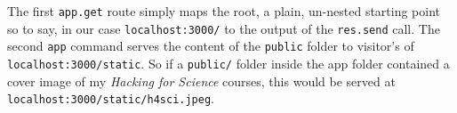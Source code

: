 \documentclass[
  12pt,
  letterpaper,
]{krantz}
\newenvironment{Shaded}{\begin{snugshade}}{\end{snugshade}}
\newcommand{\BuiltInTok}[1]{\textcolor[rgb]{0.00,0.23,0.31}{#1}}
\newcommand{\DecValTok}[1]{\textcolor[rgb]{0.68,0.00,0.00}{#1}}
\newcommand{\FunctionTok}[1]{\textcolor[rgb]{0.28,0.35,0.67}{#1}}
\newcommand{\KeywordTok}[1]{\textcolor[rgb]{0.00,0.23,0.31}{#1}}
\newcommand{\NormalTok}[1]{\textcolor[rgb]{0.00,0.23,0.31}{#1}}
\newcommand{\OperatorTok}[1]{\textcolor[rgb]{0.37,0.37,0.37}{#1}}
\newcommand{\PreprocessorTok}[1]{\textcolor[rgb]{0.68,0.00,0.00}{#1}}
\newcommand{\SpecialCharTok}[1]{\textcolor[rgb]{0.37,0.37,0.37}{#1}}
\newcommand{\StringTok}[1]{\textcolor[rgb]{0.13,0.47,0.30}{#1}}
\newcommand{\VerbatimStringTok}[1]{\textcolor[rgb]{0.13,0.47,0.30}{#1}}
\begin{document}
\begin{Shaded}
\end{Shaded}

The first \texttt{app.get} route simply maps the root, a plain,
un-nested starting point so to say, in our case \texttt{localhost:3000/}
to the output of the \texttt{res.send} call. The second \texttt{app}
command serves the content of the \texttt{public} folder to visitor's of
\texttt{localhost:3000/static}. So if a \texttt{public/} folder inside
the app folder contained a cover image of my \emph{Hacking for Science}
courses, this would be served at
\texttt{localhost:3000/static/h4sci.jpeg}.
\end{document}
